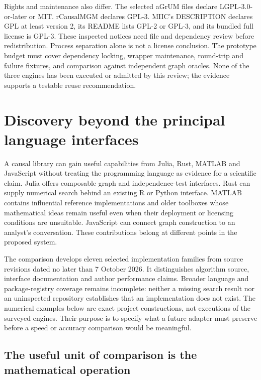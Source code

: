 Rights and maintenance also differ. The selected aGrUM files declare
LGPL-3.0-or-later or MIT. rCausalMGM declares GPL-3. MIIC's DESCRIPTION declares
GPL at least version 2, its README lists GPL-2 or GPL-3, and its bundled full
license is GPL-3. These inspected notices need file and dependency review
before redistribution. Process separation alone is not a license conclusion.
The prototype budget must cover dependency locking, wrapper maintenance,
round-trip and failure fixtures, and comparison against independent graph
oracles. None of the three engines has been executed or admitted by this
review; the evidence supports a testable reuse recommendation.
\label{exec14:cxx-latent-end}


\section{Discovery beyond the principal language interfaces}
\label{exec13:other-discovery}

A causal library can gain useful capabilities from Julia, Rust, MATLAB and
JavaScript without treating the programming language as evidence for a
scientific claim. Julia offers composable graph and independence-test
interfaces. Rust can supply numerical search behind an existing R or Python
interface. MATLAB contains influential reference implementations and older
toolboxes whose mathematical ideas remain useful even when their deployment
or licensing conditions are unsuitable. JavaScript can connect graph
construction to an analyst's conversation. These contributions belong at
different points in the proposed system.

The comparison develops eleven selected implementation families from source
revisions dated no later than 7 October 2026. It distinguishes algorithm
source, interface documentation and author performance claims. Broader
language and package-registry coverage remains incomplete: neither a missing
search result nor an uninspected repository establishes that an implementation
does not exist. The numerical examples below are exact project constructions,
not executions of the surveyed engines. Their purpose is to specify what a
future adapter must preserve before a speed or accuracy comparison would be
meaningful.

\subsection{The useful unit of comparison is the mathematical operation}

